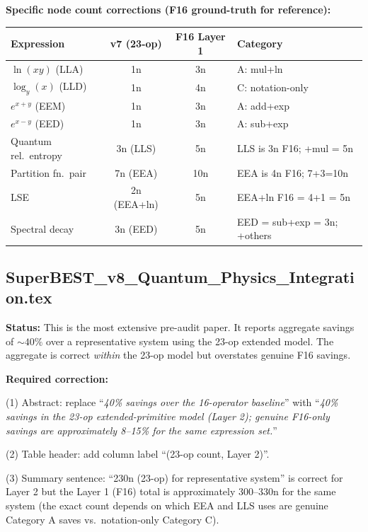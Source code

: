 \documentclass[11pt]{article}
\begin{document}
\textbf{Specific node count corrections (F16 ground-truth for reference):}
\begin{center}
\renewcommand{\arraystretch}{1.2}
\begin{tabular}{lccl}
\toprule
Expression & v7 (23-op) & F16 Layer 1 & Category \\
\midrule
$\ln(xy)$ (LLA) & 1n & 3n & A: mul+ln \\
$\log_y(x)$ (LLD) & 1n & 4n & C: notation-only \\
$e^{x+y}$ (EEM) & 1n & 3n & A: add+exp \\
$e^{x-y}$ (EED) & 1n & 3n & A: sub+exp \\
Quantum rel.\ entropy & 3n (LLS) & 5n & LLS is 3n F16; +mul = 5n \\
Partition fn.\ pair & 7n (EEA) & 10n & EEA is 4n F16; 7+3=10n \\
LSE & 2n (EEA+ln) & 5n & EEA+ln F16 = 4+1 = 5n \\
Spectral decay & 3n (EED) & 5n & EED = sub+exp = 3n; +others \\
\bottomrule
\end{tabular}
\end{center}

\subsection{SuperBEST\_v8\_Quantum\_Physics\_Integration.tex}

\textbf{Status:} This is the most extensive pre-audit paper.
It reports aggregate savings of $\sim40\%$ over a representative system using
the 23-op extended model. The aggregate is correct \emph{within} the 23-op model
but overstates genuine F16 savings.

\textbf{Required correction:}

(1) Abstract: replace ``\textit{40\% savings over the 16-operator baseline}''
with ``\textit{40\% savings in the 23-op extended-primitive model (Layer 2);
genuine F16-only savings are approximately 8--15\% for the same expression set.}''

(2) Table header: add column label ``(23-op count, Layer 2)''.

(3) Summary sentence: ``230n (23-op) for representative system'' is correct
for Layer 2 but the Layer 1 (F16) total is approximately 300--330n for the
same system (the exact count depends on which EEA and LLS uses are genuine
Category A saves vs.\ notation-only Category C).
\end{document}
